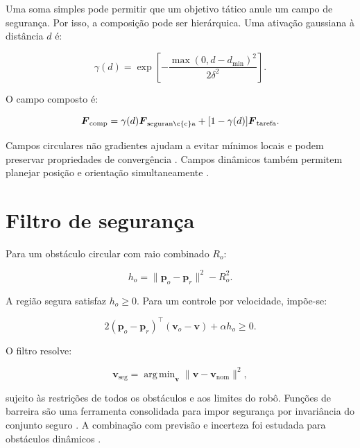 \documentclass[12pt,a4paper]{article}
\newcommand{\vect}[1]{\boldsymbol{#1}}
\DeclareMathOperator*{\argmin}{arg\,min}
\begin{document}
Uma soma simples pode permitir que um objetivo t\'atico anule um campo de seguran\c{c}a. Por isso, a composi\c{c}\~ao pode ser hier\'arquica. Uma ativa\c{c}\~ao gaussiana \`a dist\^ancia $d$ \'e:

\begin{equation}
  \gamma(d)=\exp\left[-\frac{\max(0,d-d_{\min})^2}{2\delta^2}\right].
\end{equation}

O campo composto \'e:

\begin{equation}
  \vect{F}_{\mathrm{comp}}=\gamma(d)\vect{F}_{\mathrm{seguran\c{c}a}}+[1-\gamma(d)]\vect{F}_{\mathrm{tarefa}}.
\end{equation}

Campos circulares n\~ao gradientes ajudam a evitar m\'inimos locais e podem preservar propriedades de converg\^encia \cite{panagou2014}. Campos din\^amicos tamb\'em permitem planejar posi\c{c}\~ao e orienta\c{c}\~ao simultaneamente \cite{he2022}.

\section{Filtro de seguran\c{c}a}

Para um obst\'aculo circular com raio combinado $R_o$:

\begin{equation}
  h_o=\|\vect{p}_o-\vect{p}_r\|^2-R_o^2.
\end{equation}

A regi\~ao segura satisfaz $h_o\geq0$. Para um controle por velocidade, imp\~oe-se:

\begin{equation}
  2(\vect{p}_o-\vect{p}_r)^\top(\vect{v}_o-\vect{v})+\alpha h_o\geq0.
\end{equation}

O filtro resolve:

\begin{equation}
  \vect{v}_{\mathrm{seg}}=\argmin_{\vect{v}}\|\vect{v}-\vect{v}_{\mathrm{nom}}\|^2,
\end{equation}

sujeito \`as restri\c{c}\~oes de todos os obst\'aculos e aos limites do rob\^o. Fun\c{c}\~oes de barreira s\~ao uma ferramenta consolidada para impor seguran\c{c}a por invari\^ancia do conjunto seguro \cite{ames2019}. A combina\c{c}\~ao com previs\~ao e incerteza foi estudada para obst\'aculos din\^amicos \cite{jian2022}.
\end{document}
